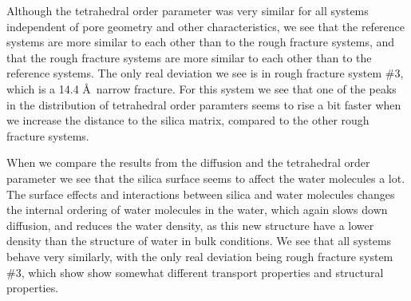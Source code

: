 Although the tetrahedral order parameter was very similar for all systems independent of pore geometry and other characteristics, we see that the reference systems are more similar to each other than to the rough fracture systems, and that the rough fracture systems are more similar to each other than to the reference systems. The only real deviation we see is in rough fracture system \#3, which is a 14.4 \AA\ narrow fracture. For this system we see that one of the peaks in the distribution of tetrahedral order paramters seems to rise a bit faster when we increase the distance to the silica matrix, compared to the other rough fracture systems.

When we compare the results from the diffusion and the tetrahedral order parameter we see that the silica surface seems to affect the water molecules a lot. The surface effects and interactions between silica and water molecules changes the internal ordering of water molecules in the water, which again slows down diffusion, and reduces the water density, as this new structure have a lower density than the structure of water in bulk conditions. We see that all systems behave very similarly, with the only real deviation being rough fracture system \#3, which show show somewhat different transport properties and structural properties.





